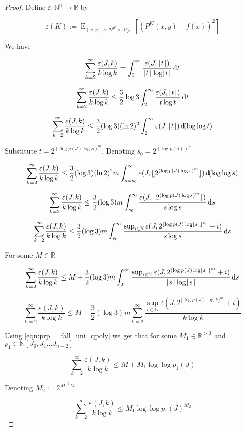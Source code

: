 \documentclass[11pt]{article}
\numberwithin{equation}{section}
\theoremstyle{definition}
\theoremstyle{plain}
\DeclareMathOperator{\E}{E}
\DeclareMathOperator{\Un}{U}
\newcommand{\Nats}{\mathbb{N}}
\newcommand{\Reals}{\mathbb{R}}
\newcommand{\NatPolyJ}{\Nats[J_0, J_1 \ldots J_{n-2}]}
\newcommand{\Floor}[1]{\lfloor #1 \rfloor}
\newcommand{\Dist}{\mathcal{D}}
\begin{document}
\begin{proof}

Define ${\varepsilon: \Nats^n \rightarrow \Reals}$ by

\[\varepsilon(K):=\E_{(x,y) \sim \Dist^K \times \Un_P^K}[(P^K(x,y)-f(x))^2]\]

We have

\[\sum_{k=2}^\infty \frac{\varepsilon(J,k)}{k \log k}=\int_2^\infty \frac{\varepsilon(J,\Floor{t})}{\Floor{t} \log \Floor{t}} \dif t\]

\[\sum_{k=2}^\infty \frac{\varepsilon(J,k)}{k \log k} \leq \frac{3}{2} \log 3 \int_2^\infty \frac{\varepsilon(J,\Floor{t})}{t \log t} \dif t\]

\[\sum_{k=2}^\infty \frac{\varepsilon(J,k)}{k \log k} \leq \frac{3}{2} (\log 3) (\ln 2)^2 \int_2^\infty \varepsilon(J,\Floor{t}) \dif (\log \log t)\]

Substitute ${t=2^{(\log p(J) \log s)^m}}$. Denoting ${s_0=2^{(\log p(J))^{-1}}}$

\[\sum_{k=2}^\infty \frac{\varepsilon(J,k)}{k \log k} \leq \frac{3}{2} (\log 3) (\ln 2)^2 m \int_{s=s_0}^\infty \varepsilon(J,\Floor{2^{(\log p(J) \log s)^m}}) \dif (\log \log s)\]

\[\sum_{k=2}^\infty \frac{\varepsilon(J,k)}{k \log k} \leq \frac{3}{2} (\log 3) m \int_{s_0}^\infty \frac{\varepsilon(J,\Floor{2^{(\log p(J) \log s)^m}})}{s \log s} \dif s\]

\[\sum_{k=2}^\infty \frac{\varepsilon(J,k)}{k \log k} \leq \frac{3}{2} (\log 3) m \int_{s_0}^\infty \frac{\sup_{i \in \Nats} \varepsilon(J,2^{\Floor{\log p(J) \log \Floor{s}}^m}+i)}{s \log s} \dif s\]

For some ${M \in \Reals}$

\[\sum_{k=2}^\infty \frac{\varepsilon(J,k)}{k \log k} \leq M + \frac{3}{2} (\log 3) m \int_{2}^\infty \frac{\sup_{i \in \Nats} \varepsilon(J,2^{\Floor{\log p(J) \log \Floor{s}}^m}+i)}{\Floor{s} \log \Floor{s}} \dif s\]

\[\sum_{k=2}^\infty \frac{\varepsilon(J,k)}{k \log k} \leq M + \frac{3}{2} (\log 3) m \sum_{k=2}^\infty \frac{\sup_{i \in \Nats} \varepsilon(J,2^{\Floor{\log p(J) \log k}^m}+i)}{k \log k}\]

Using \ref{eqn:prp__fall_uni_qpoly} we get that for some ${M_1 \in \Reals^{>0}}$ and ${p_1 \in \NatPolyJ}$

\[\sum_{k=2}^\infty \frac{\varepsilon(J,k)}{k \log k} \leq M + M_1 \log \log p_1(J)\]

Denoting ${M_2 := 2^{M_1^{-1} M}}$

\[\sum_{k=2}^\infty \frac{\varepsilon(J,k)}{k \log k} \leq M_1 \log \log p_1(J)^{M_2}\]
%
\end{proof}
\end{document}
